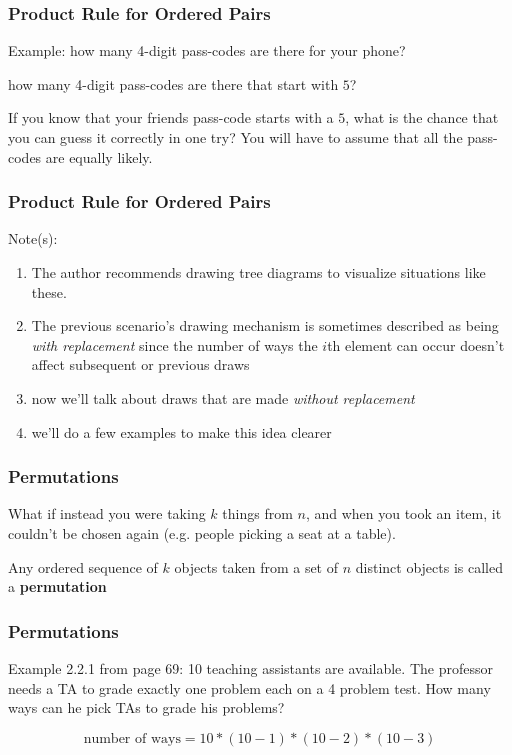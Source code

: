 \begin{frame}
\frametitle{Product Rule for Ordered Pairs}

Example: 
how many 4-digit pass-codes are there for your phone?
\newline

how many 4-digit pass-codes are there that start with $5$?
\newline

If you know that your friends pass-code starts with a $5$, what is the chance that you can guess it correctly in one try?  You will have to assume that all the pass-codes are equally likely.
\end{frame}

\begin{frame}
\frametitle{Product Rule for Ordered Pairs}

Note(s):
\begin{enumerate}
\item The author recommends drawing tree diagrams to visualize situations like these.
\item The previous scenario's drawing mechanism is sometimes described as being \emph{with replacement} since the number of ways the $i$th element can occur doesn't affect subsequent or previous draws
\item now we'll talk about draws that are made \emph{without replacement}
\item we'll do a few examples to make this idea clearer
\end{enumerate}


\end{frame}

\begin{frame}
\frametitle{Permutations}

What if instead you were taking $k$ things from $n$, and when you took an item, it couldn't be chosen again (e.g. people picking a seat at a table). 
\newline

Any ordered sequence of $k$ objects taken from a set of $n$ distinct objects is called a \textbf{permutation}

\end{frame}

\begin{frame}
\frametitle{Permutations}

Example 2.2.1 from page 69: 10 teaching assistants are available. The professor needs a TA to grade exactly one problem each on a 4 problem test. How many ways can he pick TAs to grade his problems?

\[
\text{number of ways} = 10 * (10 - 1) * (10 - 2) * (10 - 3)
\]
\end{frame}

